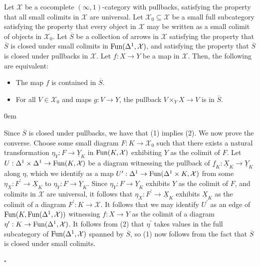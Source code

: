 \documentclass[10pt]{article}
\newcommand{\cX}{\mathcal{X}}
\renewcommand{\qed}{\hfill$\square$}
\renewenvironment{proof}{\begin{addmargin}[1em]{0em}\begin{newproof}}{\end{newproof}\end{addmargin}\qed}
\theoremstyle{witharg}
\theoremstyle{witharg}
\theoremstyle{witharg2}
\begin{document}
\begin{lemma}{}\label{Strongly Saturated Classes of Maps Tested By Rep Functors}

    Let $\cX$ be a cocomplete $(\infty,1)$-category with pullbacks, satisfying the property that all small colimits in $\cX$ are universal. Let $\cX_0\subseteq \cX$ be a small full subcategory satisfying the property that every object in $\cX$ may be written as a small colimit of objects in $\cX_0$. Let $\overline{S}$ be a collection of arrows in $\cX$ satisfying the property that $\overline{S}$ is closed under small colimits in $\textnormal{Fun}(\Delta^1,\cX)$, and satisfying the property that $\overline{S}$ is closed under pullbacks in $\cX$. Let $f:X\rightarrow Y$ be a map in $\cX$. Then, the following are equivalent:

    \begin{itemize}
    
        \item [$(1)$] The map $f$ is contained in $\overline{S}$.

        \item [$(2)$] For all $V\in \cX_0$ and maps $g:V\rightarrow Y$, the pullback $V\times_YX\rightarrow V$ is in $\overline{S}$.
        
    \end{itemize}
    
\end{lemma}

\begin{proof}

    Since $\overline{S}$ is closed under pullbacks, we have that (1) implies (2). We now prove the converse. Choose some small diagram $F:K\rightarrow \cX_0$ such that there exists a natural transformation $\eta_Y:F\rightarrow \underline{Y}_K$ in $\textnormal{Fun}(K,\cX)$ exhibiting $Y$ as the colimit of $F$. Let $U:\Delta^1\times \Delta^1\rightarrow \textnormal{Fun}(K,\cX)$ be a diagram witnessing the pullback of $\underline{f}_K:\underline{X}_K\rightarrow \underline{Y}_K$ along $\eta$, which we identify as a map $U^\prime:\Delta^1\rightarrow \textnormal{Fun}(\Delta^1\times K,\cX)$ from some $\eta_X:F^\prime\rightarrow \underline{X}_K$ to $\eta_Y:F\rightarrow \underline{Y}_K$. Since $\eta_Y:F\rightarrow \underline{Y}_K$ exhibits $Y$ as the colimit of $F$, and colimits in $\cX$ are universal, it follows that $\eta_X:F^\prime\rightarrow \underline{X}_K$ exhibits $\underline{X}_K$ as the colimit of a diagram $F^\prime:K\rightarrow \cX$. It follows that we may identify $U^\prime$ as an edge of $\textnormal{Fun}(K,\textnormal{Fun}(\Delta^1,\cX))$ witnessing $f:X\rightarrow Y$ as the colimit of a diagram $\eta^\prime:K\rightarrow \textnormal{Fun}(\Delta^1,\cX)$. It follows from (2) that $\eta^\prime$ takes values in the full subcategory of $\textnormal{Fun}(\Delta^1,\cX)$ spanned by $\overline{S}$, so (1) now follows from the fact that $\overline{S}$ is closed under small colimits. 

    
\end{proof}
\end{document}
